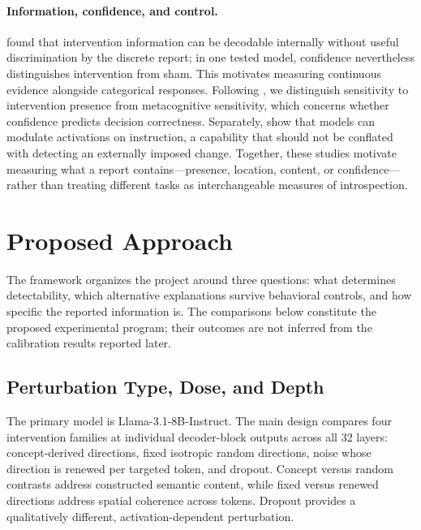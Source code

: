 \paragraph{Information, confidence, and control.}
\citet{ferrara2026} found that intervention information can be decodable internally without useful discrimination by the discrete report; in one tested model, confidence nevertheless distinguishes intervention from sham.
This motivates measuring continuous evidence alongside categorical responses.
Following \citet{fleming2014}, we distinguish sensitivity to intervention presence from metacognitive sensitivity, which concerns whether confidence predicts decision correctness.
Separately, \citet{kowalski2026} show that models can modulate activations on instruction, a capability that should not be conflated with detecting an externally imposed change.
Together, these studies motivate measuring what a report contains---presence, location, content, or confidence---rather than treating different tasks as interchangeable measures of introspection.

\section{Proposed Approach}
\label{sec:proposal}

The framework organizes the project around three questions: what determines detectability, which alternative explanations survive behavioral controls, and how specific the reported information is.
The comparisons below constitute the proposed experimental program; their outcomes are not inferred from the calibration results reported later.

\subsection{Perturbation Type, Dose, and Depth}

The primary model is Llama-3.1-8B-Instruct.
The main design compares four intervention families at individual decoder-block outputs across all 32 layers: concept-derived directions, fixed isotropic random directions, noise whose direction is renewed per targeted token, and dropout.
Concept versus random contrasts address constructed semantic content, while fixed versus renewed directions address spatial coherence across tokens.
Dropout provides a qualitatively different, activation-dependent perturbation.

